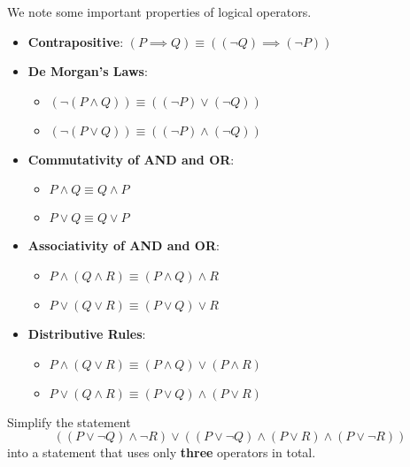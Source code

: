 We note some important properties of logical operators.
\begin{itemize}
    \item \textbf{Contrapositive}: $(P \implies Q) \equiv ((\lnot Q) \implies (\lnot P))$
    \item \textbf{De Morgan's Laws}: \begin{itemize}
        \item $(\lnot (P \land Q)) \equiv ((\lnot P) \lor (\lnot Q))$
        \item $(\lnot (P \lor Q)) \equiv ((\lnot P) \land (\lnot Q))$
    \end{itemize}
    \item \textbf{Commutativity of AND and OR}: \begin{itemize}
        \item $P \land Q \equiv Q \land P$
        \item $P \lor Q \equiv Q \lor P$
    \end{itemize}
    \item \textbf{Associativity of AND and OR}: \begin{itemize}
        \item $P \land (Q \land R) \equiv (P \land Q) \land R$
        \item $P \lor (Q \lor R) \equiv (P \lor Q) \lor R$
    \end{itemize}
    \item \textbf{Distributive Rules}: \begin{itemize}
        \item $P \land (Q \lor R) \equiv (P \land Q) \lor (P \land R)$
        \item $P \lor (Q \land R) \equiv (P \lor Q) \land (P \lor R)$
    \end{itemize}
\end{itemize}
\begin{exercise}
    Simplify the statement
    \[
        ((P \lor \lnot Q) \land \lnot R) \lor ((P \lor \lnot Q) \land (P \lor R) \land (P \lor \lnot R))
    \]
    into a statement that uses only \textbf{three} operators in total.
\end{exercise}

